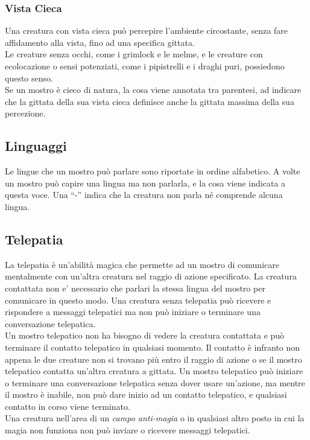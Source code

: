 \begin{multicols}{2}
\subsubsection{Vista Cieca}

Una creatura con vista cieca può percepire l'ambiente circostante, senza fare affidamento alla vista, fino ad una specifica gittata. \\
Le creature senza occhi, come i grimlock e le melme, e le creature con ecolocazione o sensi potenziati, come i pipistrelli e i draghi puri, possiedono questo senso. \\
Se un mostro è cieco di natura, la cosa viene annotata tra parentesi, ad indicare che la gittata della sua vista cieca definisce anche la gittata massima della sua percezione.\\

\subsection{Linguaggi}

Le lingue che un mostro può parlare sono riportate in ordine alfabetico. A volte un mostro può capire una lingua ma non parlarla, e la cosa viene indicata a questa voce. Una ``-'' indica che la creatura non parla né comprende alcuna lingua.

\subsection{Telepatia}

La telepatia è un'abilità magica che permette ad un mostro di comunicare mentalmente con un'altra creatura nel raggio di azione specificato. La creatura contattata non e' necessario che parlari la stessa lingua del mostro per comunicare in questo modo. Una creatura senza telepatia può ricevere e rispondere a messaggi telepatici ma non può iniziare o terminare una conversazione telepatica.\\
Un mostro telepatico non ha bisogno di vedere la creatura contattata e può terminare il contatto telepatico in qualsiasi momento. Il contatto è infranto non appena le due creature non si trovano più entro il raggio di azione o se il mostro telepatico contatta un'altra creatura a gittata. Un mostro telepatico può iniziare o terminare una conversazione  telepatica senza dover usare un'azione, ma mentre il mostro è inabile, non può dare inizio ad un contatto telepatico, e qualsiasi contatto in corso viene terminato.\\
Una creatura nell'area di un \emph{campo anti-magia} o in qualsiasi altro posto in cui la magia non funziona non può inviare o ricevere messaggi telepatici.


\end{multicols}
